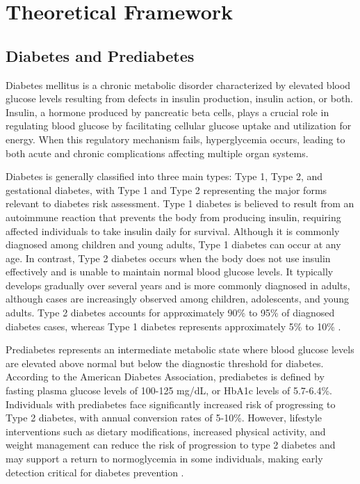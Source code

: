 \section{Theoretical Framework}

\subsection{Diabetes and Prediabetes}

Diabetes mellitus is a chronic metabolic disorder characterized by elevated blood glucose levels resulting from defects in insulin production, insulin action, or both. Insulin, a hormone produced by pancreatic beta cells, plays a crucial role in regulating blood glucose by facilitating cellular glucose uptake and utilization for energy. When this regulatory mechanism fails, hyperglycemia occurs, leading to both acute and chronic complications affecting multiple organ systems.

Diabetes is generally classified into three main types: Type 1, Type 2, and gestational diabetes, with Type 1 and Type 2 representing the major forms relevant to diabetes risk assessment. Type 1 diabetes is believed to result from an autoimmune reaction that prevents the body from producing insulin, requiring affected individuals to take insulin daily for survival. Although it is commonly diagnosed among children and young adults, Type 1 diabetes can occur at any age. In contrast, Type 2 diabetes occurs when the body does not use insulin effectively and is unable to maintain normal blood glucose levels. It typically develops gradually over several years and is more commonly diagnosed in adults, although cases are increasingly observed among children, adolescents, and young adults. Type 2 diabetes accounts for approximately 90\% to 95\% of diagnosed diabetes cases, whereas Type 1 diabetes represents approximately 5\% to 10\% \cite{cdc_diabetes_basics_2026}.

Prediabetes represents an intermediate metabolic state where blood glucose levels are elevated above normal but below the diagnostic threshold for diabetes. According to the American Diabetes Association, prediabetes is defined by fasting plasma glucose levels of 100-125 mg/dL, or HbA1c levels of 5.7-6.4\%. Individuals with prediabetes face significantly increased risk of progressing to Type 2 diabetes, with annual conversion rates of 5-10\%. However, lifestyle interventions such as dietary modifications, increased physical activity, and weight management can reduce the risk of progression to type 2 diabetes and may support a return to normoglycemia in some individuals, making early detection critical for diabetes prevention \cite{ada_diabetes_diagnosis}.

